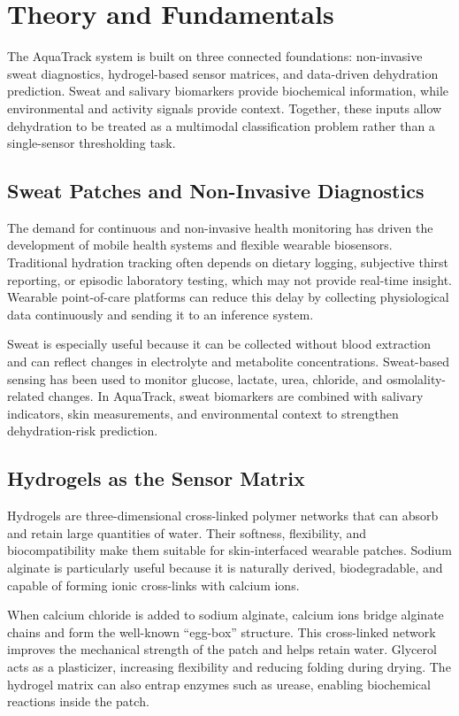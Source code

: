 \chapter{Theory and Fundamentals}

The AquaTrack system is built on three connected foundations: non-invasive sweat diagnostics, hydrogel-based sensor matrices, and data-driven dehydration prediction. Sweat and salivary biomarkers provide biochemical information, while environmental and activity signals provide context. Together, these inputs allow dehydration to be treated as a multimodal classification problem rather than a single-sensor thresholding task.

\section{Sweat Patches and Non-Invasive Diagnostics}

The demand for continuous and non-invasive health monitoring has driven the development of mobile health systems and flexible wearable biosensors. Traditional hydration tracking often depends on dietary logging, subjective thirst reporting, or episodic laboratory testing, which may not provide real-time insight. Wearable point-of-care platforms can reduce this delay by collecting physiological data continuously and sending it to an inference system.

Sweat is especially useful because it can be collected without blood extraction and can reflect changes in electrolyte and metabolite concentrations. Sweat-based sensing has been used to monitor glucose, lactate, urea, chloride, and osmolality-related changes. In AquaTrack, sweat biomarkers are combined with salivary indicators, skin measurements, and environmental context to strengthen dehydration-risk prediction.

\section{Hydrogels as the Sensor Matrix}

Hydrogels are three-dimensional cross-linked polymer networks that can absorb and retain large quantities of water. Their softness, flexibility, and biocompatibility make them suitable for skin-interfaced wearable patches. Sodium alginate is particularly useful because it is naturally derived, biodegradable, and capable of forming ionic cross-links with calcium ions.

When calcium chloride is added to sodium alginate, calcium ions bridge alginate chains and form the well-known ``egg-box'' structure. This cross-linked network improves the mechanical strength of the patch and helps retain water. Glycerol acts as a plasticizer, increasing flexibility and reducing folding during drying. The hydrogel matrix can also entrap enzymes such as urease, enabling biochemical reactions inside the patch.

